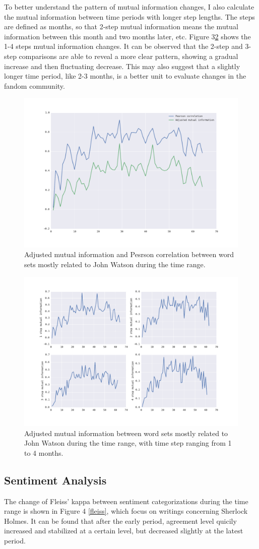 \documentclass{pnastwo}
\begin{document}
\begin{article}
To better understand the pattern of mutual information changes, I also calculate the mutual information between time periods with longer step lengths. The steps are defined as months, so that 2-step mutual information means the mutual information between this month and two months later, etc. Figure 3\ref{multi_mi} shows the 1-4 steps mutual information changes. It can be observed that the 2-step and 3-step comparisons are able to reveal a more clear pattern, showing a gradual increase and then fluctuating decrease. This may also suggest that a slightly longer time period, like 2-3 months, is a better unit to evaluate changes in the fandom community. 


\begin{figure}
\centerline{\includegraphics[width=.4\textwidth]{mi_pearson_watson.pdf}}
\caption{Adjusted mutual information and Pesrson correlation between word sets mostly related to John Watson during the time range.}\label{mi_pearson}
\end{figure}

\begin{figure}
\centerline{\includegraphics[width=.5\textwidth]{muti_step_mi_john.pdf}}
\caption{Adjusted mutual information between word sets mostly related to John Watson during the time range, with time step ranging from 1 to 4 months.}\label{multi_mi} 
\end{figure}


\subsection{Sentiment Analysis} The change of Fleiss' kappa between sentiment categorizations during the time range is shown in Figure 4 \ref{fleiss}, which focus on writings concerning Sherlock Holmes. It can be found that after the early period, agreement level quicily increased and stabilized at a certain level, but decreased slightly at the latest period.


\end{article}
\end{document}
